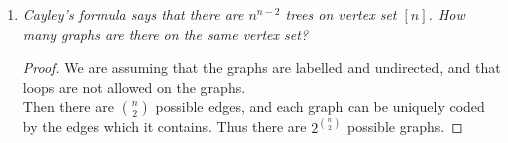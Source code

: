 \documentclass{article}
\begin{document}
\begin{enumerate}[label={\bf Q\arabic*:}]
\begin{proof}
      (d)$\Rightarrow$(c): Assume (d) holds but the graph $G$ is not
      connected. Then $G$ is the disjoint union of finitely many connected
      subgraphs, each being acyclic since $G$ is acyclic. Then from (e) and
      the equivalence of (e) with (c), the number of edges of each subgraph
      is one less than its number of vertices. Then $G$ would have $n-k$
      edges, where $k$ is the number of disjoint subgraphs. This
      contradicts $G$ having $n-1$ edges.
    \end{proof}

  \item \it Cayley's formula says that there are $n^{n-2}$ trees on vertex
    set $[n]$. How many graphs are there on the same vertex set?

    \begin{proof}
      We are assuming that the graphs are labelled and undirected, and that
      loops are not allowed on the graphs. \\

      Then there are $\binom{n}{2}$ possible edges, and each graph can be
      uniquely coded by the edges which it contains. Thus there are
      $2^{\binom{n}{2}}$ possible graphs.
    \end{proof}
\end{enumerate}
\end{document}
